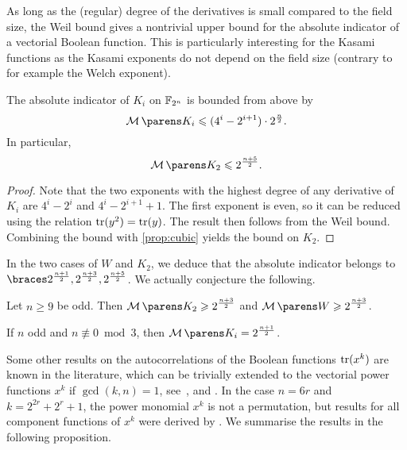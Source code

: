 As long as the (regular) degree of the derivatives is small compared to the field size, the Weil bound gives a nontrivial upper bound for the absolute indicator of a vectorial Boolean function.
This is particularly interesting for the Kasami functions as the Kasami exponents do not depend on the field size (contrary to for example the Welch exponent).
\begin{proposition}
    The absolute indicator of $K_i$ on $\mathbb{F}_{2^n}$ is bounded from above by
    \begin{equation*}
        \absoluteindicator{K_i} \leqslant (4^i-2^{i+1}) \cdot 2^{\frac{n}{2}}.
    \end{equation*}
    In particular,
    \begin{equation*}
        \absoluteindicator{K_2} \leqslant 2^{\frac{n+5}{2}}.
    \end{equation*}
\end{proposition}
\begin{proof}
    Note that the two exponents with the highest degree of any derivative of $K_i$ are $4^i-2^i$ and $4^i-2^{i+1}+1$.
    The first exponent is even, so it can be reduced using the relation $\operatorname{tr}(y^2)=\operatorname{tr}(y)$.
    The result then follows from the Weil bound.
    Combining the bound with \cref{prop:cubic} yields the bound on $K_2$.
\end{proof}
In the two cases of $W$ and $K_2$, we deduce that the absolute indicator belongs to $\set{2^{\frac{n+1}{2}}, 2^{\frac{n+3}{2}}, 2^{\frac{n+5}{2}}}$.
We actually conjecture the following.
\begin{conjecture}\label{con:kasami_welch}
    Let $n \geqslant 9$ be odd.
    Then $\displaystyle\absoluteindicator{K_2} \geqslant 2^{\frac{n+3}{2}}$ and $\displaystyle\absoluteindicator{W} \geqslant 2^{\frac{n+3}{2}}$.
\end{conjecture}

\begin{conjecture}\label{con:kasami}
    If $n$ odd and $n \not \equiv 0 \bmod{3}$, then $\absoluteindicator{K_i} = 2^{\frac{n+1}{2}}$.
\end{conjecture}

Some other results on the autocorrelations of the Boolean functions $\operatorname{tr}(x^k)$ are known in the literature, which can be trivially extended to the vectorial power functions $x^k$ if $\gcd(k,n)=1$, see~\cite[Theorem 5]{SAC:GonKho03}, \cite{TIT:Carlet08} and \cite[Lemmata 2 and 3]{IS:SunWu09}.
In the case $n = 6r$ and $k=2^{2r}+2^r+1$, the power monomial $x^k$ is not a permutation, but results for all component functions of $x^k$ were derived by \textcite{FFA:CanChaKyu08}.
We summarise the results in the following proposition.

